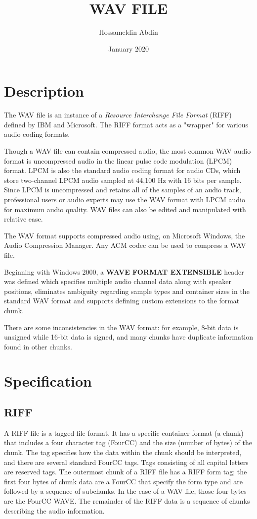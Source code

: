 \documentclass[12pt, a4paper]{article}
\title{WAV FILE}
\author{Hossameldin Abdin}
\date{January 2020}
\begin{document}
\maketitle
\section{Description}
The WAV file is an instance of a \textit{Resource Interchange File Format} (RIFF) defined by IBM and Microsoft.
The RIFF format acts as a "wrapper" for various audio coding formats.

Though a WAV file can contain compressed audio, the most common WAV audio format is uncompressed audio in the linear pulse code modulation (LPCM) format. LPCM is also the standard audio coding format for audio CDs, which store two-channel LPCM audio sampled at 44,100 Hz with 16 bits per sample. Since LPCM is uncompressed and retains all of the samples of an audio track, professional users or audio experts may use the WAV format with LPCM audio for maximum audio quality. WAV files can also be edited and manipulated with relative ease.

The WAV format supports compressed audio using, on Microsoft Windows, the Audio Compression Manager. Any ACM codec can be used to compress a WAV file.

Beginning with Windows 2000, a \textbf{WAVE FORMAT EXTENSIBLE} header was defined which specifies multiple audio channel data along with speaker positions, eliminates ambiguity regarding sample types and container sizes in the standard WAV format and supports defining custom extensions to the format chunk.

There are some inconsistencies in the WAV format: for example, 8-bit data is unsigned while 16-bit data is signed, and many chunks have duplicate information found in other chunks.

\section{Specification}
\subsection{RIFF}
A RIFF file is a tagged file format. It has a specific container format (a chunk) that includes a four character tag (FourCC) and the size (number of bytes) of the chunk. The tag specifies how the data within the chunk should be interpreted, and there are several standard FourCC tags. Tags consisting of all capital letters are reserved tags. The outermost chunk of a RIFF file has a RIFF form tag; the first four bytes of chunk data are a FourCC that specify the form type and are followed by a sequence of subchunks. In the case of a WAV file, those four bytes are the FourCC WAVE. The remainder of the RIFF data is a sequence of chunks describing the audio information.
\end{document}
